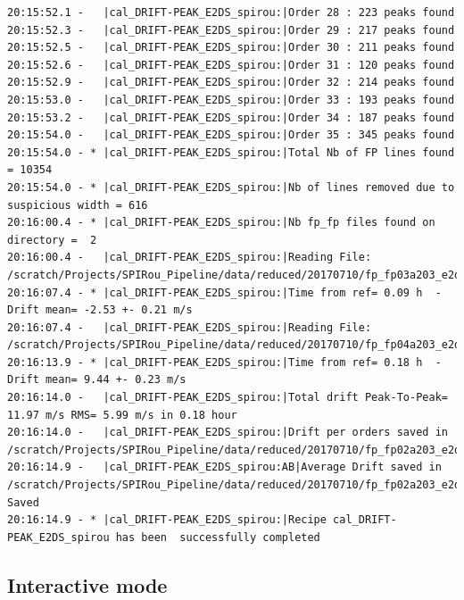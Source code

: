 \begin{lstlisting}[style=text]
20:15:52.1 -   |cal_DRIFT-PEAK_E2DS_spirou:|Order 28 : 223 peaks found
20:15:52.3 -   |cal_DRIFT-PEAK_E2DS_spirou:|Order 29 : 217 peaks found
20:15:52.5 -   |cal_DRIFT-PEAK_E2DS_spirou:|Order 30 : 211 peaks found
20:15:52.6 -   |cal_DRIFT-PEAK_E2DS_spirou:|Order 31 : 120 peaks found
20:15:52.9 -   |cal_DRIFT-PEAK_E2DS_spirou:|Order 32 : 214 peaks found
20:15:53.0 -   |cal_DRIFT-PEAK_E2DS_spirou:|Order 33 : 193 peaks found
20:15:53.2 -   |cal_DRIFT-PEAK_E2DS_spirou:|Order 34 : 187 peaks found
20:15:54.0 -   |cal_DRIFT-PEAK_E2DS_spirou:|Order 35 : 345 peaks found
20:15:54.0 - * |cal_DRIFT-PEAK_E2DS_spirou:|Total Nb of FP lines found = 10354 
20:15:54.0 - * |cal_DRIFT-PEAK_E2DS_spirou:|Nb of lines removed due to suspicious width = 616 
20:16:00.4 - * |cal_DRIFT-PEAK_E2DS_spirou:|Nb fp_fp files found on directory =  2 
20:16:00.4 -   |cal_DRIFT-PEAK_E2DS_spirou:|Reading File: /scratch/Projects/SPIRou_Pipeline/data/reduced/20170710/fp_fp03a203_e2ds_AB.fits
20:16:07.4 - * |cal_DRIFT-PEAK_E2DS_spirou:|Time from ref= 0.09 h  - Drift mean= -2.53 +- 0.21 m/s
20:16:07.4 -   |cal_DRIFT-PEAK_E2DS_spirou:|Reading File: /scratch/Projects/SPIRou_Pipeline/data/reduced/20170710/fp_fp04a203_e2ds_AB.fits
20:16:13.9 - * |cal_DRIFT-PEAK_E2DS_spirou:|Time from ref= 0.18 h  - Drift mean= 9.44 +- 0.23 m/s
20:16:14.0 -   |cal_DRIFT-PEAK_E2DS_spirou:|Total drift Peak-To-Peak= 11.97 m/s RMS= 5.99 m/s in 0.18 hour 
20:16:14.0 -   |cal_DRIFT-PEAK_E2DS_spirou:|Drift per orders saved in /scratch/Projects/SPIRou_Pipeline/data/reduced/20170710/fp_fp02a203_e2ds_AB_driftnew.fits
20:16:14.9 -   |cal_DRIFT-PEAK_E2DS_spirou:AB|Average Drift saved in /scratch/Projects/SPIRou_Pipeline/data/reduced/20170710/fp_fp02a203_e2ds_AB_driftnew.tbl Saved 
20:16:14.9 - * |cal_DRIFT-PEAK_E2DS_spirou:|Recipe cal_DRIFT-PEAK_E2DS_spirou has been  successfully completed

\end{lstlisting}

\subsection{Interactive mode}

